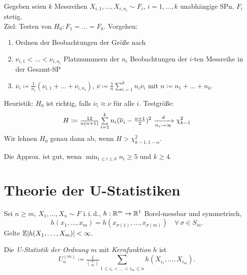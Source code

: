 \documentclass{cheat-sheet}
\newcommand{\E}{\mathbb{E}} %
\newcommand{\iid}{i.\,i.\,d.} %
\newcommand{\testh}[1]{\textcolor{TestColor}{\textbf{#1}}}
\begin{document}
\begin{test}
  Gegeben seien $k$ Messreihen $X_{i,1}, \ldots, X_{i,n_i} \sim F_i$, $i = 1, \ldots, k$ unabhängige SPn, $F_i$ stetig. \\
  Ziel: Testen von \testh{$H_0 : F_1 = \ldots = F_k$}.
  Vorgehen:
  \begin{enumerate}
    \item Ordnen der Beobachtungen der Größe nach
    \item $\nu_{i,1} < \ldots < \nu_{i,n_i}$ Platznummern der $n_i$ Beobachtungen der $i$-ten Messreihe in der Gesamt-SP
    \item $\overline{\nu}_i \coloneqq \tfrac{1}{n_i} (\nu_{i,1} + \ldots + \nu_{i,n_i})$, $\overline{\nu} \coloneqq \tfrac{1}{n} \sum_{i=1}^k n_i \overline{\nu}_i$ mit $n \coloneqq n_1 + \ldots + n_k$.
  \end{enumerate}
  Heuristik: $H_0$ ist richtig, falls $\overline{\nu}_i \approx \overline{\nu}$ für alle $i$.
  Testgröße:
  \[
    H \coloneqq \tfrac{12}{n (n+1)} \sum_{i=1}^k n_i (\overline{\nu}_i - \tfrac{n+1}{2})^2
    \xra[n_i \to \infty]{d} \chi^2_{k-1}
  \]
  Wir lehnen $H_0$ genau dann ab, wenn $H > \chi^2_{k-1,1-\alpha}$.
\end{test}

\begin{faustregel}
  Die Approx. ist gut, wenn $\min_{1 \leq i \leq k} n_i \geq 5$ und $k \geq 4$.
\end{faustregel}

\section{Theorie der U-Statistiken}


\begin{situation}
  Sei $n \geq m$, $X_1, \ldots, X_n \sim F$ \iid{}, $h : \mathbb{R}^m \to \mathbb{R}^1$ Borel-messbar und symmetrisch, \dh{}
  \[
    h(x_1, \ldots, x_m) = h(x_{\sigma(1)}, \ldots, x_{\sigma(m)}) \quad
    \forall \, \sigma \in S_m.
  \]
  Gelte $\E \abs{h(X_1, \ldots, X_m)} < \infty$.
\end{situation}

\begin{defn}
  Die \emph{U-Statistik der Ordnung $m$} mit \textit{Kernfunktion} $h$ ist
  \[ U_n^{(m)} \coloneqq \tfrac{1}{\binom{n}{m}} \sum_{1 \leq i_1 < \ldots < i_m \leq n} h(X_{i_1}, \ldots, X_{i_m}). \]
\end{defn}
\end{document}
